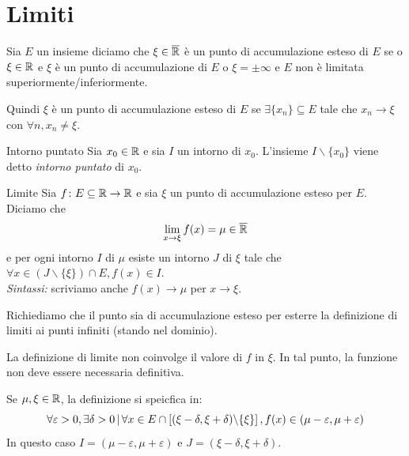\documentclass[a4paper]{article}
\begin{document}

\pagebreak

\section{Limiti}

\begin{radioactive}
\begin{snippetdefinition}{}
    Sia \(E\) un insieme diciamo che \(\xi\in\overline{\mathbb{R}}\)
    è un punto di accumulazione esteso di \(E\)
    se o \(\xi \in \mathbb{R}\) e \(\xi\) è un punto di accumulazione di \(E\)
    o \(\xi = \pm \infty\) e \(E\) non è limitata superiormente/inferiormente.
\end{snippetdefinition}

Quindi \(\xi\) è un punto di accumulazione esteso di \(E\)
se \(\exists \{x_n\} \subseteq E\) tale che \(x_n \to \xi\) con  \(\forall n, x_n \neq \xi\).

\begin{snippetdefinition}{Intorno puntato}
    Sia \(x_0 \in \mathbb{R}\) e sia \(I\) un intorno di \(x_0\).
    L'insieme \(I\backslash\{x_0\}\) viene detto \emph{intorno puntato} di \(x_0\).
\end{snippetdefinition}

\begin{snippetdefinition}{Limite}
    Sia \(f\colon E \subseteq \mathbb{R} \to \mathbb{R}\) e sia \(\xi\)
    un punto di accumulazione esteso per \(E\).
    Diciamo che
    \[
        \lim_{x\to\xi} f(x) = \mu \in \overline{\mathbb{R}}
    \]
    e per ogni intorno \(I\) di \(\mu\) esiste un intorno \(J\) di \(\xi\)
    tale che \(\forall x\in \left(J \backslash \{\xi\}\right) \cap E, f(x) \in I\). \\
    \emph{Sintassi:} scriviamo anche \(f(x) \to \mu\) per \(x\to \xi\).
\end{snippetdefinition}

Richiediamo che il punto sia di accumulazione esteso
per esterre la definizione di limiti ai punti infiniti (stando nel dominio).

La definizione di limite non coinvolge il valore di \(f\) in \(\xi\).
In tal punto, la funzione non deve essere necessaria definitiva.

Se \(\mu, \xi \in \mathbb{R}\), la definizione si speicfica in:
\[
    \forall \varepsilon > 0,
    \exists \delta > 0 \,|\,
    \forall x \in E \cap \left[(\xi - \delta, \xi + \delta) \backslash \{\xi\}\right],
    f(x) \in (\mu - \varepsilon, \mu + \varepsilon)
\]
In questo caso \(I=(\mu - \varepsilon, \mu + \varepsilon)\)
e \(J=(\xi - \delta, \xi + \delta)\).


\end{radioactive}
\end{document}
